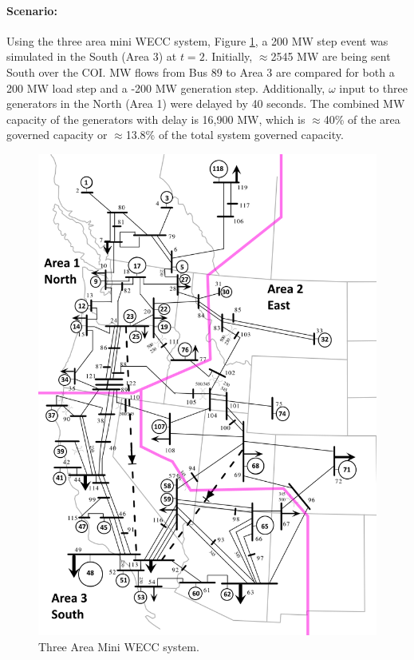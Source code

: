 \documentclass[12pt]{article}
\begin{document}
\paragraph{Scenario: } 
Using the three area mini WECC system, Figure \ref{fig: miniWECC}, a 200 MW step event was simulated in the South (Area 3) at $t=2$.
Initially, $\approx$2545 MW are being sent South over the COI.
MW flows from Bus 89 to Area 3 are compared for both a 200 MW load step and a -200 MW generation step.
Additionally, $\omega$ input to three generators in the North (Area 1) were delayed by 40 seconds.
The combined MW capacity of the generators with delay is 16,900 MW, which is $\approx$40\% of the area governed capacity or $\approx$13.8\% of the total system governed capacity.

\begin{figure}[!ht]
	\centering
	\footnotesize
	\includegraphics[height=6.5 in]{../../../paint.net/miniWECC_split/miniWECC_split03}
	\caption{Three Area Mini WECC system.}
	\label{fig: miniWECC}
\end{figure}
\end{document}
